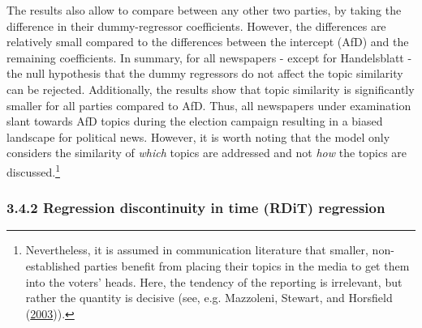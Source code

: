 \documentclass[
  12pt,
]{article}
\begin{document}
The results also allow to compare between any other two parties, by
taking the difference in their dummy-regressor coefficients. However,
the differences are relatively small compared to the differences between
the intercept (AfD) and the remaining coefficients. In summary, for all
newspapers - except for Handelsblatt - the null hypothesis that the
dummy regressors do not affect the topic similarity can be rejected.
Additionally, the results show that topic similarity is significantly
smaller for all parties compared to AfD. Thus, all newspapers under
examination slant towards AfD topics during the election campaign
resulting in a biased landscape for political news. However, it is worth
noting that the model only considers the similarity of \emph{which}
topics are addressed and not \emph{how} the topics are
discussed.\footnote{Nevertheless, it is assumed in communication
  literature that smaller, non-established parties benefit from placing
  their topics in the media to get them into the voters' heads. Here,
  the tendency of the reporting is irrelevant, but rather the quantity
  is decisive (see, e.g. Mazzoleni, Stewart, and Horsfield
  (\protect\hyperlink{ref-mazzoleni_media_2003}{2003})).}

\hypertarget{rdit}{%
\subsubsection{3.4.2 Regression discontinuity in time (RDiT)
regression}\label{rdit}}
\end{document}
